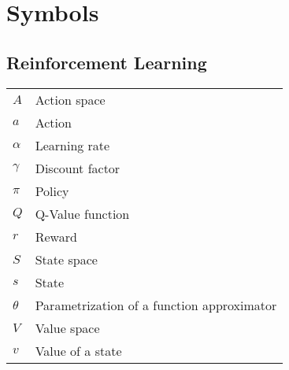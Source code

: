 
\section*{Symbols}\label{sec:symbols}
\subsection{Reinforcement Learning}\label{subsec:reinforcement-learning}
\begin{tabular}{l l}
    $A$     & Action space\\
    $a$     & Action\\
    $\alpha$    & Learning rate\\
    $\gamma$    & Discount factor\\
    $\pi$   & Policy\\
    $Q$     & Q-Value function\\
    $r$     & Reward\\
    $S$     & State space\\
    $s$     & State\\
    $\theta$    & Parametrization of a function approximator\\
    $V$     & Value space\\
    $v$     & Value of a state\\
\end{tabular}